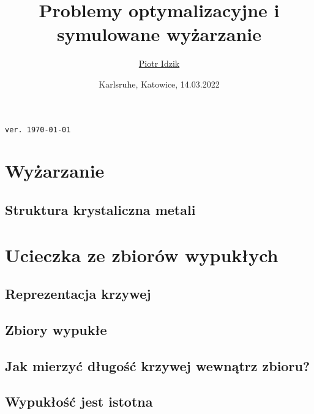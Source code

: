 \documentclass[aspectratio=169]{beamer}
\author{\texorpdfstring{\href{\myLinkedinLink}{Piotr Idzik} \\ \email{\myEmail}}{Piotr Idzik}}
\title{Problemy optymalizacyjne i symulowane wyżarzanie}
\date{Karlsruhe, Katowice, 14.03.2022}
\newcommand{\myLinkedinLink}{https://www.linkedin.com/in/piotr-idzik-34b572151/}
\newcommand{\myGithubLink}{https://github.com/vil02/}
\newcommand{\myLinkedin}{\href{\myLinkedinLink}{\faLinkedinSquare}}
\newcommand{\myGithub}{\href{\myGithubLink}{\faGithubSquare}}
\begin{document}
\begin{frame}[plain]
\maketitle

\myLinkedin{}
\myGithub{}
\hfill \textcolor[rgb]{0.85,0.85,0.85}{\texttt{\tiny{ver. \today\ \currenttime\/}}}
\end{frame}

\section{Wyżarzanie}
\subsection{Struktura krystaliczna metali}
{\crystalsExamplesTex}

\section{Ucieczka ze zbiorów wypukłych}
\subsection{Reprezentacja krzywej}
{\curveRepresentationExampleTex}
\subsection{Zbiory wypukłe}
{\convexExamplesTex}
\subsection{Jak mierzyć długość krzywej wewnątrz zbioru?}
{\lengthInsideExampleTex}
\subsection{Wypukłość jest istotna}
{\lengthInsideExampleNonconvexTex}

\begin{frame}
\begin{columns}
\begin{column}{0.5\textwidth}
  \begin{figure}
    	{\escapeFromCircleLogoTex}
  \end{figure}
\end{column}
\begin{column}{0.5\textwidth}
  \begin{figure}
    	{\escapeFromCircleAzimuthTex}
  \end{figure}
\end{column}
\end{columns}
\end{frame}
\end{document}
